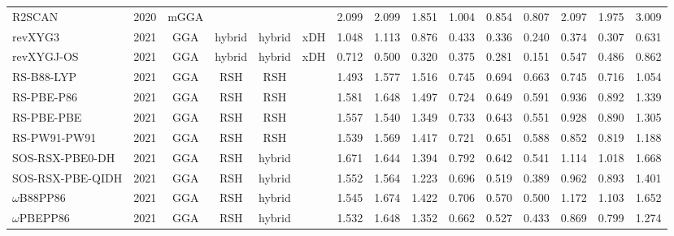 \begin{landscape}
\begin{longtable}{ll:cccc:rrr:rrr:rrr}
    R2SCAN           & 2020 & mGGA &          &             &           & 2.099             & 2.099             & 1.851  & 1.004              & 0.854             & 0.807  & 2.097   & 1.975 & 3.009 \\
    revXYG3          & 2021 & GGA  & hybrid   & hybrid      & xDH       & 1.048             & 1.113             & 0.876  & 0.433              & 0.336             & 0.240  & 0.374   & 0.307 & 0.631 \\
    revXYGJ-OS       & 2021 & GGA  & hybrid   & hybrid      & xDH       & 0.712             & 0.500             & 0.320  & 0.375              & 0.281             & 0.151  & 0.547   & 0.486 & 0.862 \\
    RS-B88-LYP       & 2021 & GGA  & RSH      & RSH         &           & 1.493             & 1.577             & 1.516  & 0.745              & 0.694             & 0.663  & 0.745   & 0.716 & 1.054 \\
    RS-PBE-P86       & 2021 & GGA  & RSH      & RSH         &           & 1.581             & 1.648             & 1.497  & 0.724              & 0.649             & 0.591  & 0.936   & 0.892 & 1.339 \\
    RS-PBE-PBE       & 2021 & GGA  & RSH      & RSH         &           & 1.557             & 1.540             & 1.349  & 0.733              & 0.643             & 0.551  & 0.928   & 0.890 & 1.305 \\
    RS-PW91-PW91     & 2021 & GGA  & RSH      & RSH         &           & 1.539             & 1.569             & 1.417  & 0.721              & 0.651             & 0.588  & 0.852   & 0.819 & 1.188 \\
    SOS-RSX-PBE0-DH  & 2021 & GGA  & RSH      & hybrid      &           & 1.671             & 1.644             & 1.394  & 0.792              & 0.642             & 0.541  & 1.114   & 1.018 & 1.668 \\
    SOS-RSX-PBE-QIDH & 2021 & GGA  & RSH      & hybrid      &           & 1.552             & 1.564             & 1.223  & 0.696              & 0.519             & 0.389  & 0.962   & 0.893 & 1.401 \\
    $\omega$B88PP86         & 2021 & GGA  & RSH      & hybrid      &           & 1.545             & 1.674             & 1.422  & 0.706              & 0.570             & 0.500  & 1.172   & 1.103 & 1.652 \\
    $\omega$PBEPP86         & 2021 & GGA  & RSH      & hybrid      &           & 1.532             & 1.648             & 1.352  & 0.662              & 0.527             & 0.433  & 0.869   & 0.799 & 1.274 \\

\end{longtable}
\end{landscape}
